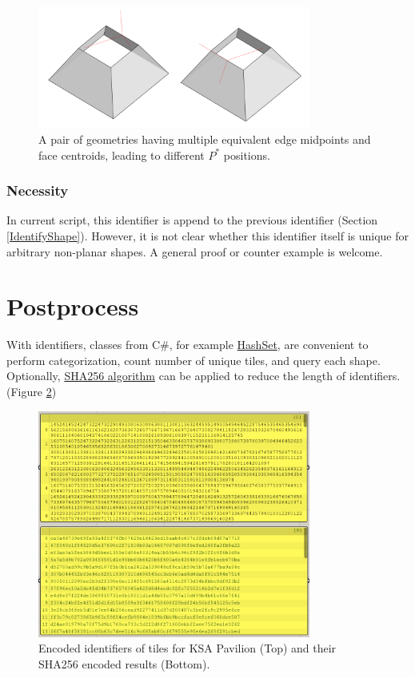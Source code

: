 \documentclass{article}
\begin{document}
\begin{figure}[hbt!]
	\centering
	\includegraphics[width=0.8\textwidth]{Figures/IdentifierCounterExample3.png}
	\caption{
        A pair of geometries having multiple equivalent edge midpoints and face centroids, leading to different $P^*$ positions.
    }
	\label{idcexample3}
\end{figure}

\subsubsection{Necessity} In current script, this identifier is append to the previous identifier (Section \ref{IdentifyShape}). However, it is not clear whether this identifier itself is unique for arbitrary non-planar shapes. A general proof or counter example is welcome.

\section{Postprocess}

With identifiers, classes from C\#, for example \href{https://learn.microsoft.com/en-us/dotnet/api/system.collections.generic.hashset-1?view=net-7.0}{HashSet}, are convenient to perform categorization, count number of unique tiles, and query each shape. Optionally, \href{https://learn.microsoft.com/en-us/dotnet/api/system.security.cryptography.sha256?view=net-7.0}{SHA256 algorithm} can be applied to reduce the length of identifiers. (Figure \ref{result})

\begin{figure}[hbt!]
	\centering
	\includegraphics[width=0.8\textwidth]{Figures/EncodedTiles.png}
	\caption{
        Encoded identifiers of tiles for KSA Pavilion (Top) and their SHA256 encoded results (Bottom).
    }
	\label{result}
\end{figure}
\end{document}
